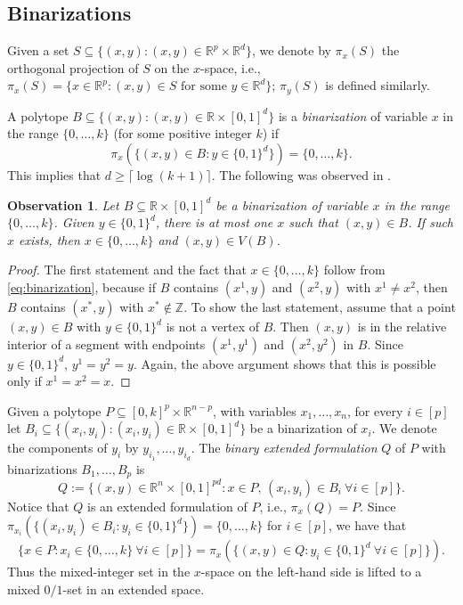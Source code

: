 \documentclass[11pt,a4paper]{article}
\newtheorem{observation}[theorem]{Observation}
\newcommand{\R}{\mathbb{R}}
\newcommand{\Z}{\mathbb{Z}}
\newcommand{\1}{\textbf{1}}
\begin{document}
\subsection{Binarizations}\label{sec:bin}

Given a set $S\subseteq\{(x,y):(x,y)\in\R^p\times\R^d\}$, we denote by $\pi_x(S)$ the orthogonal projection of $S$ on the $x$-space, i.e., $\pi_x(S)=\{x\in\R^p:(x,y)\in S\mbox{ for some $y\in\R^d$}\}$; $\pi_y(S)$ is defined similarly.

  A polytope $B\subseteq\{(x,y):(x,y)\in \R\times [0,1]^d\}$ is a \emph{binarization} of variable  $x$ in the range $\{0,\dots,k\}$ (for some positive integer $k$) if
  \begin{equation}\label{eq:binarization}
  \pi_{x}(\{(x,y)\in B:y\in \{0,1\}^d\})=\{0,\dots,k\}.
  \end{equation}
  This implies that $d\ge \lceil \log (k+1)\rceil$.
The following was observed in \cite{dash2018binary}.

\begin{observation}\label{obs:onex}
 Let $B\subseteq \R\times [0,1]^d$ be a binarization of variable  $x$ in the range $\{0,\dots,k\}$. Given  $y\in \{0,1\}^d$, there is at most one $x$ such that $(x,y)\in B$. 
If such $x$ exists, then $x\in \{0,\dots,k\}$ and $(x,y)\in V(B)$.
\end{observation}

\begin{proof}   The first statement and the fact that  $x\in \{0,\dots,k\}$  follow from \eqref{eq:binarization}, because if $B$ contains $(x^1,y)$ and $(x^2,y)$ with $x^1\ne x^2$, then $B$ contains $(x^*,y)$ with $x^*\not\in \Z$. 
To show the last statement, assume that a point $(x,y)\in B$ with $y\in \{0,1\}^d$ is not a vertex of $B$. Then $(x,y)$ is in the relative interior of a segment with endpoints $(x^1,y^1)$ and $(x^2,y^2)$ in $B$.  Since $y\in \{0,1\}^d$, $y^1=y^2=y$. Again, the above argument shows that this is possible only if $x^1=x^2=x$.
\end{proof}



Given a polytope $P\subseteq [0,k]^p\times \R^{n-p}$, with variables $x_1,\dots,x_n$, for every $i\in[p]$ let $B_i\subseteq\{(x_i,y_i):(x_i,y_i)\in \R\times [0,1]^d\}$ be a binarization of $x_i$. We denote the components of $y_i$ by $y_{i_1},\dots,y_{i_d}$.
 The \emph{binary extended formulation} $Q$ of $P$ with binarizations $B_1,\dots, B_p$ is 
$$
Q:=\{(x,y)\in \R^n\times [0,1]^{pd}: x\in P,\, (x_i,y_i) \in B_i \:\forall i\in [p]\}.
$$
Notice that $Q$ is an extended formulation of $P$, i.e., $\pi_x(Q)=P$. Since $\pi_{x_i}(\{(x_i,y_i)\in B_i:y_i\in \{0,1\}^d\})=\{0,\dots,k\}$ for $i\in [p]$, we have that
$$\{x\in P:x_i\in \{0,\dots,k\}\:\forall i\in[p]\}=\pi_x\left(\{(x,y)\in Q: y_{i}\in\{0,1\}^d\: \forall i\in [p]\}\right).$$
Thus the mixed-integer set in the $x$-space on the left-hand side is lifted to a mixed $0/1$-set in an extended space.
\end{document}
